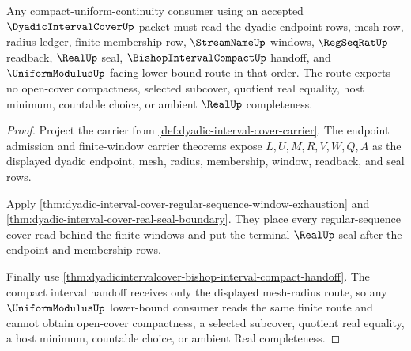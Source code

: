 \begin{theorem}
\label{thm:dyadic-interval-cover-compact-uniform-window-route}
Any compact-uniform-continuity consumer using an accepted $\DyadicIntervalCoverUp$ packet must read the dyadic endpoint rows, mesh row, radius ledger, finite membership row, $\StreamNameUp$ windows, $\RegSeqRatUp$ readback, $\RealUp$ seal, $\BishopIntervalCompactUp$ handoff, and $\UniformModulusUp$-facing lower-bound route in that order. The route exports no open-cover compactness, selected subcover, quotient real equality, host minimum, countable choice, or ambient $\RealUp$ completeness.
\end{theorem}
\begin{proof}
Project the carrier from \autoref{def:dyadic-interval-cover-carrier}. The endpoint admission and finite-window carrier theorems expose $L,U,M,R,V,W,Q,A$ as the displayed dyadic endpoint, mesh, radius, membership, window, readback, and seal rows.

Apply \autoref{thm:dyadic-interval-cover-regular-sequence-window-exhaustion} and \autoref{thm:dyadic-interval-cover-real-seal-boundary}. They place every regular-sequence cover read behind the finite windows and put the terminal $\RealUp$ seal after the endpoint and membership rows.

Finally use \autoref{thm:dyadicintervalcover-bishop-interval-compact-handoff}. The compact interval handoff receives only the displayed mesh-radius route, so any $\UniformModulusUp$ lower-bound consumer reads the same finite route and cannot obtain open-cover compactness, a selected subcover, quotient real equality, a host minimum, countable choice, or ambient Real completeness.
\end{proof}

